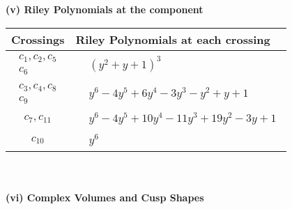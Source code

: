 \documentclass[1p]{elsarticle_modified}
\theoremstyle{definition}
\begin{document}
\newpage\renewcommand{\arraystretch}{1}
\flushleft \textbf{(v) Riley Polynomials at the component}\newline \\
\begin{tabular}{m{50pt}|m{274pt}}
Crossings & \hspace{64pt}Riley Polynomials at each crossing \\
\hline $$\begin{aligned}c_{1},c_{2},c_{5}\\c_{6}\end{aligned}$$&$\begin{aligned}
&(y^2+y+1)^3
\end{aligned}$\\
\hline $$\begin{aligned}c_{3},c_{4},c_{8}\\c_{9}\end{aligned}$$&$\begin{aligned}
&y^6-4 y^5+6 y^4-3 y^3- y^2+y+1
\end{aligned}$\\
\hline $$\begin{aligned}c_{7},c_{11}\end{aligned}$$&$\begin{aligned}
&y^6-4 y^5+10 y^4-11 y^3+19 y^2-3 y+1
\end{aligned}$\\
\hline $$\begin{aligned}c_{10}\end{aligned}$$&$\begin{aligned}
&y^6
\end{aligned}$\\
\hline
\end{tabular}\\~\\
\newpage\flushleft \textbf{(vi) Complex Volumes and Cusp Shapes}
\end{document}
